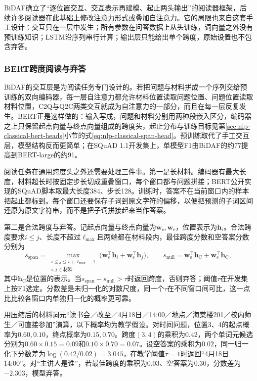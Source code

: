 BiDAF确立了“逐位置交互、交互表示再建模、起止两头输出”的阅读器框架，后续许多阅读器在此基础上修改注意力形式或叠加自注意力。它的局限也来自这套手工设计：交互只在一层中发生；所有参数在问答数据上从头训练，词向量之外没有预训练知识；LSTM沿序列串行计算；输出层只能给出单个跨度，原始设置也不包含弃答。

\subsubsection{BERT跨度阅读与弃答}
\label{sec:nlp-dialogue-bert-span}

BiDAF的交互层是为阅读任务专门设计的。若把问题与材料拼成一个序列交给预训练的双向编码器，每一层自注意力都允许材料位置读取问题位置、问题位置读取材料位置，C2Q与Q2C两类交互就成为自注意力的一部分，而且在每一层反复发生。BERT正是这样做的：输入写成，问题和材料分别用两种段嵌入区分，编码器之上只保留起点向量与终点向量组成的跨度头，起止分布与训练目标见第\ref{sec:nlp-classical-bert-heads}小节的式\eqref{eq:nlp-classical-span-head}。预训练取代了手工交互层，模型结构反而更简单；在SQuAD 1.1开发集上，单模型F1由BiDAF的约77提高到BERT-large的约91。

阅读任务在通用跨度头之外还需要处理三件事。第一是长材料。编码器有最大长度，材料超长时按固定步长切成重叠窗口，每个窗口都与问题拼接；BERT公开实现的SQuAD脚本取最大长度384、步长128。训练时，答案不在当前窗口内的样本把起止都标到\code{[CLS]}。每个窗口还要保存子词到原文字符的偏移，以便把预测的子词区间还原为原文字符串，而不是把子词拼接起来当作答案。

第二是合法跨度与弃答。记起点向量与终点向量为$\bm w_{\mathrm s},\bm w_{\mathrm e}$，位置表示为$\bm h_i$。合法跨度要求$i\leq j$、长度不超过$\ell_{\max}$且两端都在材料段内，最佳跨度分数和空答案分数分别为
\begin{equation}
  s_{\mathrm{span}}=\max_{\substack{i\leq j\leq i+\ell_{\max}-1\\ i,j\in\text{材料}}}
  \bigl(\bm w_{\mathrm s}^{\top}\bm h_i+\bm w_{\mathrm e}^{\top}\bm h_j\bigr),
  \qquad
  s_{\mathrm{null}}=\bm w_{\mathrm s}^{\top}\bm h_{\mathrm C}+\bm w_{\mathrm e}^{\top}\bm h_{\mathrm C},
  \label{eq:nlp-dialogue-span}
\end{equation}
其中$\bm h_{\mathrm C}$是\code{[CLS]}位置的表示。当$s_{\mathrm{span}}-s_{\mathrm{null}}>\tau$时返回跨度，否则弃答；阈值$\tau$在开发集上按F1选定。分数差是未归一化的对数尺度，同一个$\tau$在不同窗口间可比，这一点比比较各窗口内单独归一化的概率更可靠。

用压缩后的材料词元“读书会／改至／4月18日／14:00／地点／海棠楼201／校内师生／可直接参加”演算，以下概率均为教学假设。对时间问题，位置3、4的起点概率为$0.60,0.10$，终点概率为$0.15,0.70$。跨度$(3,4)$的乘积为$0.42$，两个单词元候选分别为$0.60\times0.15=0.09$和$0.10\times0.70=0.07$。设空答案的乘积为$0.02$，同一归一化下分数差为$\log(0.42/0.02)=3.045$，在教学阈值$\tau=1$时返回“4月18日14:00”。对“主讲人是谁”，若最佳跨度的乘积为$0.03$、空答案为$0.30$，分数差为$-2.303$，模型弃答。

